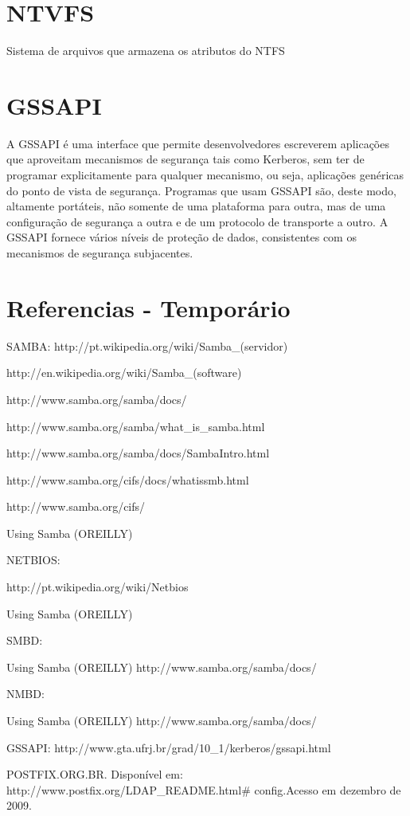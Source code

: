 \section{NTVFS}

Sistema de arquivos que armazena os atributos do NTFS

\section{GSSAPI}

A GSSAPI é uma interface que permite desenvolvedores escreverem aplicações que aproveitam mecanismos de segurança tais como Kerberos, sem ter de programar explicitamente para qualquer mecanismo, ou seja, aplicações genéricas do ponto de vista de segurança. Programas que usam GSSAPI são, deste modo, altamente portáteis, não somente de uma plataforma para outra, mas de uma configuração de segurança a outra e de um protocolo de transporte a outro. A GSSAPI fornece vários níveis de proteção de dados, consistentes com os mecanismos de segurança subjacentes.


\section{Referencias - Temporário}
SAMBA:
http://pt.wikipedia.org/wiki/Samba\_(servidor)

http://en.wikipedia.org/wiki/Samba\_(software)

http://www.samba.org/samba/docs/

http://www.samba.org/samba/what\_is\_samba.html

http://www.samba.org/samba/docs/SambaIntro.html

http://www.samba.org/cifs/docs/what\-is\-smb.html

http://www.samba.org/cifs/

Using Samba (OREILLY)

NETBIOS:

http://pt.wikipedia.org/wiki/Netbios

Using Samba (OREILLY)

SMBD: 

Using Samba (OREILLY)
http://www.samba.org/samba/docs/

NMBD:

Using Samba (OREILLY)
http://www.samba.org/samba/docs/

GSSAPI:
http://www.gta.ufrj.br/grad/10\_1/kerberos/gssapi.html

POSTFIX.ORG.BR. Disponível em: http://www.postfix.org/LDAP\_README.html\# config.Acesso em dezembro de 2009.

